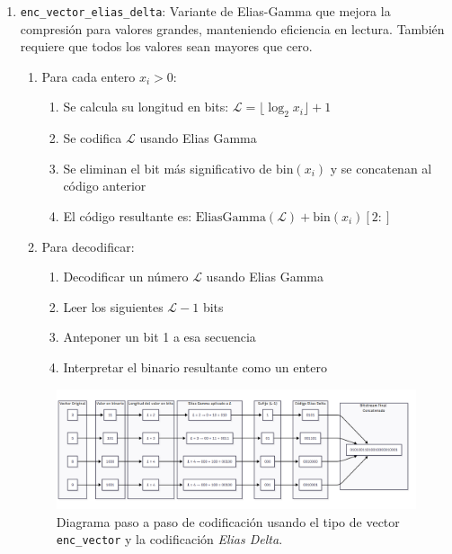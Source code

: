 \begin{enumerate}
    \item \texttt{enc\_vector\_elias\_delta}: 
        Variante de Elias-Gamma que mejora la compresión para valores grandes, manteniendo eficiencia en lectura. También requiere que todos los valores sean mayores que cero.
            
        \begin{enumerate}
            \item Para cada entero \(x_i > 0\):
            \begin{enumerate}
                \item Se calcula su longitud en bits: \(\mathcal{L} = \lfloor \log_2 x_i \rfloor + 1\)
                \item Se codifica \(\mathcal{L}\) usando Elias Gamma
                \item Se eliminan el bit más significativo de \(\text{bin}(x_i)\) y se concatenan al código anterior
                \item El código resultante es: \(\text{EliasGamma}(\mathcal{L}) + \text{bin}(x_i)[2:]\)
            \end{enumerate}
            \item Para decodificar:
            \begin{enumerate}
                \item Decodificar un número \( \mathcal{L} \) usando Elias Gamma
                \item Leer los siguientes \(\mathcal{L} - 1\) bits
                \item Anteponer un bit 1 a esa secuencia
                \item Interpretar el binario resultante como un entero
            \end{enumerate}
        \end{enumerate}
        
        \begin{figure}
            \centering
            \includegraphics[width=0.9\linewidth]{alternatives/images/enc_vector_elias_delta.png}
            \caption[Ejemplo \texttt{enc\_vector\_elias\_delta}]{Diagrama paso a paso de codificación usando el tipo de vector \texttt{enc\_vector} y la codificación \textit{Elias Delta}.}
            \label{enc_vector_elias_delta}
        \end{figure}
        


\end{enumerate}

